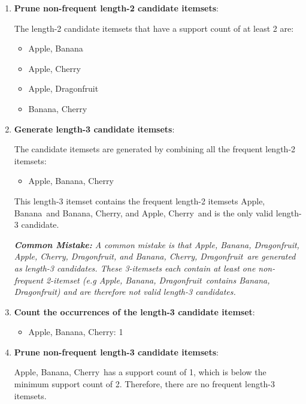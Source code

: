 \documentclass[
english,
smallborders
]{i6prcsht}
\begin{document}
\begin{solution}
\begin{enumerate}
		\item \textbf{Prune non-frequent length-2 candidate itemsets}:

		      The length-2 candidate itemsets that have a support count of at least 2 are:

		      \begin{itemize}
			      \item Apple, Banana
			      \item Apple, Cherry
			      \item Apple, Dragonfruit
			      \item Banana, Cherry
		      \end{itemize}

		\item \textbf{Generate length-3 candidate itemsets}:

		      The candidate itemsets are generated by combining all the frequent length-2 itemsets:

		      \begin{itemize}
			      \item Apple, Banana, Cherry
		      \end{itemize}

		      This length-3 itemset contains the frequent length-2 itemsets \glqq Apple, Banana\grqq\ and \glqq Banana, Cherry\grqq , and \glqq Apple, Cherry\grqq\ and is the only valid length-3 candidate.

		      \textit{\textbf{Common Mistake:} A common mistake is that \glqq Apple, Banana, Dragonfruit\grqq , \glqq Apple, Cherry, Dragonfruit\grqq , and \glqq Banana, Cherry, Dragonfruit\grqq\ are generated as length-3 candidates. These 3-itemsets each contain at least one non-frequent 2-itemset (e.g \glqq Apple, Banana, Dragonfruit\grqq\ contains \glqq Banana, Dragonfruit\grqq ) and are therefore not valid length-3 candidates.}

		\item \textbf{Count the occurrences of the length-3 candidate itemset}:

		      \begin{itemize}
			      \item Apple, Banana, Cherry: 1
		      \end{itemize}

		\item \textbf{Prune non-frequent length-3 candidate itemsets}:

		      \glqq Apple, Banana, Cherry\grqq\ has a support count of 1, which is below the minimum support count of 2. Therefore, there are no frequent length-3 itemsets.


\end{enumerate}
\end{solution}
\end{document}
